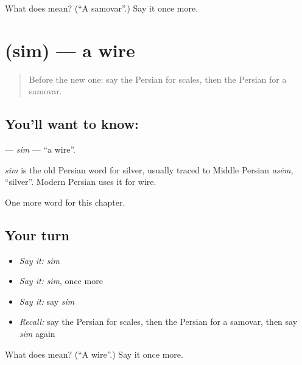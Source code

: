 \begin{tcolorbox}[breakable,colback=teal!4,colframe=teal!35!black,title={Before you move on}]
What does  mean? (\textquotedblleft{}A samovar\textquotedblright{}.) Say it once more.
\end{tcolorbox}
\section[\texorpdfstring{\fa{سیم} (sim)}{سیم (sim)}]{ (sim) — a wire}

\label{lesson:FA-C247-sim}



\begin{quote}
Before the new one: say the Persian for scales, then the Persian for a samovar.
\end{quote}

\subsection*{You'll want to know: }
\textbf{} — \emph{sim} — \textquotedblleft{}a wire\textquotedblright{}.

\begin{cousinweb}
\emph{sim} is the old Persian word for silver, usually traced to Middle Persian \emph{asēm}, \textquotedblleft{}silver\textquotedblright{}. Modern Persian uses it for wire.
\end{cousinweb}

\begin{grammarlens}[title={What you've built}]
One more word for this chapter.
\end{grammarlens}

\subsection*{Your turn}
\begin{itemize}
\raggedright
  \item \emph{Say it:} \emph{sim}
  \item \emph{Say it:} \emph{sim}, once more
  \item \emph{Say it:} say \emph{sim}
  \item \emph{Recall:} say the Persian for scales, then the Persian for a samovar, then say \emph{sim} again
\end{itemize}

\begin{tcolorbox}[breakable,colback=teal!4,colframe=teal!35!black,title={Before you move on}]
What does  mean? (\textquotedblleft{}A wire\textquotedblright{}.) Say it once more.
\end{tcolorbox}
